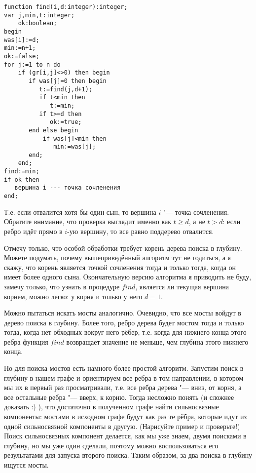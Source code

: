 \begin{codesample}\begin{verbatim}
function find(i,d:integer):integer;
var j,min,t:integer;
    ok:boolean;
begin
was[i]:=d;
min:=n+1;
ok:=false;
for j:=1 to n do
    if (gr[i,j]<>0) then begin
       if was[j]=0 then begin
          t:=find(j,d+1);
          if t<min then
             t:=min;
          if t>=d then
             ok:=true;
       end else begin
           if was[j]<min then
              min:=was[j];
       end;
    end;
find:=min;
if ok then
   вершина i --- точка сочленения
end;
\end{verbatim}\end{codesample}
Т.е. если отвалится хотя бы один сын, то вершина $i$ "--- точка сочленения. Обратите внимание, что проверка выглядит
именно как $t\geq d$, а не $t>d$: если ребро идёт прямо в $i$-ую вершину, то все равно поддерево отвалится.

Отмечу только, что особой обработки требует корень дерева поиска в глубину. Можете подумать, почему вышеприведённый 
алгоритм тут не годиться, а я скажу, что корень является точкой сочленения тогда и только тогда, когда он
имеет более одного сына. Окончательную версию алгоритма я приводить не буду, замечу только, что узнать в
процедуре $find$, является ли текущая вершина корнем, можно легко: у корня и только у него $d=1$.

 Можно пытаться искать мосты аналогично. Очевидно, что все мосты войдут в дерево поиска в глубину.
Более того, ребро дерева будет мостом тогда и только тогда, когда нет обходных вокруг него рёбер, т.е. когда для
нижнего конца этого ребра функция $find$ возвращает значение не меньше, чем глубина этого нижнего конца.


Но для поиска мостов есть намного более простой алгоритм. Запустим поиск в глубину в нашем графе и ориентируем 
все ребра в том направлении, в котором мы их в первый раз просматривали, т.е. все ребра дерева "---
вниз, от корня, а все остальные ребра "--- вверх, к корню. Тогда несложно понять (и сложнее доказать :) ),
что достаточно в полученном графе найти сильносвязные компоненты: мостами в исходном графе будут как раз те рёбра,
которые идут из одной сильносвязной компоненты в другую. (Нарисуйте пример и проверьте!) Поиск сильносвязных компонент
делается, как мы уже знаем, двумя поисками в глубину, но мы уже один сделали, поэтому можно воспользоваться
его результатами для запуска второго поиска. Таким образом, за два поиска в глубину ищутся мосты.

